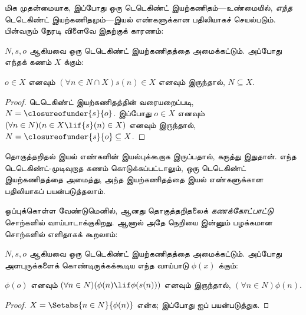 \documentclass[../../../include/open-logic-section]{subfiles}
\begin{document}

மிக முதன்மையாக, இப்போது ஒரு டெடெகிண்ட் இயற்கணிதம்---உண்மையில்,
\emph{எந்த} டெடெகிண்ட் இயற்கணிதமும்---இயல் எண்களுக்கான பதிலியாகச்
செயல்படும். பின்வரும் நேரடி விளைவே இதற்குக் காரணம்:

\begin{thm}[கணிதத் தொகுத்தறிதல்]
$N, s, o$ ஆகியவை ஒரு டெடெகிண்ட் இயற்கணிதத்தை அமைக்கட்டும்.
அப்போது எந்தக் கணம் $X$ க்கும்:
	\begin{center}
		$o \in X$ எனவும் $(\forall {n} \in N \cap X){s}({n}) \in X$
        எனவும் இருந்தால், $N \subseteq X$.
	\end{center}
\end{thm}

\begin{proof}
டெடெகிண்ட் இயற்கணிதத்தின் வரையறைப்படி,
$N = \closureofunder{s}{o}$.
இப்போது ${o} \in X$ எனவும் $(\forall {n} \in N)(n \in X \lif
{s}({n}) \in X)$ எனவும் இருந்தால்,
$N = \closureofunder{s}{o} \subseteq X$.
\end{proof}

தொகுத்தறிதல் இயல் எண்களின் இயல்புக்கூறாக இருப்பதால், கருத்து இதுதான்.
எந்த டெடெகிண்ட்-முடிவுறாத கணம் கொடுக்கப்பட்டாலும், ஒரு டெடெகிண்ட்
இயற்கணிதத்தை அமைத்து, அந்த இயற்கணிதத்தை இயல் எண்களுக்கான பதிலியாகப்
பயன்படுத்தலாம்.

ஒப்புக்கொள்ள வேண்டுமெனில்,  ஆனது
தொகுத்தறிதலைக் \emph{கணக்கோட்பாட்டு} சொற்களில் வாய்பாடாக்குகிறது.
ஆனால் அதே நெறியை இன்னும் பழக்கமான சொற்களில் எளிதாகக் கூறலாம்:

\begin{cor}
$N, s, o$ ஆகியவை ஒரு டெடெகிண்ட் இயற்கணிதத்தை அமைக்கட்டும்.
அப்போது அளபுருக்களைக் கொண்டிருக்கக்கூடிய எந்த வாய்பாடு
$\phi(x)$ க்கும்:
\begin{center}
	$\phi(o)$ எனவும் $(\forall {n} \in N)(\phi(n)\lif
	\phi({s}({n})))$ எனவும் இருந்தால், $(\forall n \in N)\phi(n)$.
\end{center}
\end{cor}

\begin{proof}
$X = \Setabs{n \in N}{\phi(n)}$ என்க; இப்போது
 ஐப் பயன்படுத்துக.
\end{proof}
\end{document}

